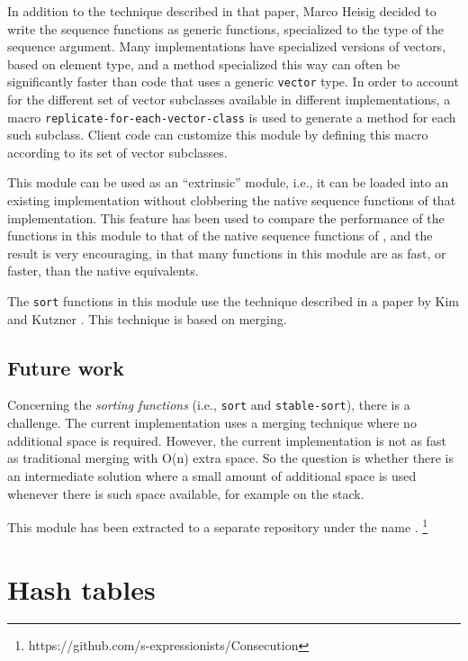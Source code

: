 In addition to the technique described in that paper, Marco Heisig
decided to write the sequence functions as generic functions,
specialized to the type of the sequence argument.  Many
implementations have specialized versions of vectors, based on element
type, and a method specialized this way can often be significantly
faster than code that uses a generic \texttt{vector} type.  In order
to account for the different set of vector subclasses available in
different \commonlisp{} implementations, a macro
\texttt{replicate-for-each-vector-class} is used to generate a method
for each such subclass.  Client code can customize this module by
defining this macro according to its set of vector subclasses.

This module can be used as an ``extrinsic'' module, i.e., it can be
loaded into an existing \commonlisp{} implementation without
clobbering the native sequence functions of that implementation.  This
feature has been used to compare the performance of the functions in
this module to that of the native sequence functions of \sbcl{}, and
the result is very encouraging, in that many functions in this module
are as fast, or faster, than the native \sbcl{} equivalents.

The \texttt{sort} functions in this module use the technique described
in a paper by Kim and Kutzner \cite{10.1007/978-3-540-30140-0_63}.
This technique is based on merging.

\subsection{Future work}
\label{sec-sequence-functions-future-work}

Concerning the \emph{sorting functions} (i.e., \texttt{sort} and
\texttt{stable-sort}), there is a challenge.  The current
implementation uses a merging technique where no additional space is
required.  However, the current implementation is not as fast as
traditional merging with O(n) extra space.  So the question is whether
there is an intermediate solution where a small amount of additional
space is used whenever there is such space available, for example on
the stack.

This module has been extracted to a separate repository under the name
\consecution{}.%
\footnote{https://github.com/s-expressionists/Consecution}

\section{Hash tables}
\label{sec-hash-tables}

